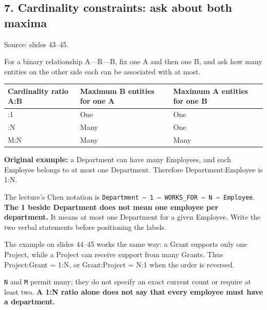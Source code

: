 \subsection{7. Cardinality constraints: ask about both maxima}\label{02_er_modelling_en-cardinality-constraints-ask-about-both-maxima}

Source: slides 43--45.

For a binary relationship A---R---B, fix one A and then one B, and ask how many entities on the other side each can be associated with at most.

\begin{longtable}[]{@{}
  >{\raggedright\arraybackslash}p{}
  >{\raggedright\arraybackslash}p{}
  >{\raggedright\arraybackslash}p{}@{}}
\toprule\noalign{}
\begin{minipage}[b]{\linewidth}\raggedright
Cardinality ratio A:B
\end{minipage} & \begin{minipage}[b]{\linewidth}\raggedright
Maximum B entities for one A
\end{minipage} & \begin{minipage}[b]{\linewidth}\raggedright
Maximum A entities for one B
\end{minipage} \\
\midrule\noalign{}
\endhead
\bottomrule\noalign{}
\endlastfoot
1:1 & One & One \\
1:N & Many & One \\
M:N & Many & Many \\
\end{longtable}

\textbf{Original example:} a Department can have many Employees, and each Employee belongs to at most one Department. Therefore Department:Employee is 1:N.

The lecture's Chen notation is \texttt{Department\ —\ 1\ —\ WORKS\_FOR\ —\ N\ —\ Employee}. \textbf{The 1 beside Department does not mean one employee per department.} It means at most one Department for a given Employee. Write the two verbal statements before positioning the labels.

The example on slides 44--45 works the same way: a Grant supports only one Project, while a Project can receive support from many Grants. Thus Project:Grant = 1:N, or Grant:Project = N:1 when the order is reversed.

\texttt{N} and \texttt{M} permit many; they do not specify an exact current count or require at least two. \textbf{A 1:N ratio alone does not say that every employee must have a department.}

